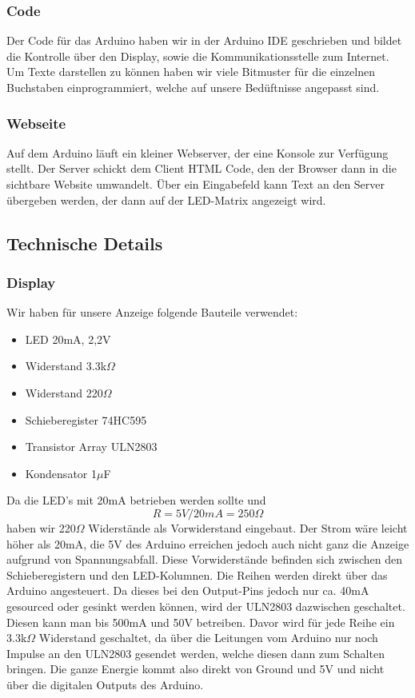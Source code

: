 \documentclass[10pt,a4paper]{article}
\begin{document}
\subsubsection{Code}

Der Code für das Arduino haben wir in der Arduino IDE geschrieben und bildet die Kontrolle über den Display, sowie die Kommunikationsstelle zum Internet.\\
Um Texte darstellen zu können haben wir viele Bitmuster für die einzelnen Buchstaben einprogrammiert, welche auf unsere Bedüftnisse angepasst sind.\\

\subsubsection{Webseite}

Auf dem Arduino läuft ein kleiner Webserver, der eine Konsole zur Verfügung stellt. Der Server schickt dem Client HTML Code, den der Browser dann in die sichtbare Website umwandelt. Über ein Eingabefeld kann Text an den Server übergeben werden, der dann auf der LED-Matrix angezeigt wird.

\subsection{Technische Details}

\subsubsection{Display}

Wir haben für unsere Anzeige folgende Bauteile verwendet:

\begin{itemize}
\item LED 20mA, 2,2V
\item Widerstand 3.3k$\Omega$
\item Widerstand 220$\Omega$
\item Schieberegister 74HC595
\item Transistor Array ULN2803
\item Kondensator 1$\mu$F
\end{itemize}

Da die LED's mit 20mA betrieben werden sollte und  \[R = 5V/20mA = 250\Omega\] haben wir 220$\Omega$ Widerstände als Vorwiderstand eingebaut. Der Strom wäre leicht höher als 20mA, die 5V des Arduino erreichen jedoch auch nicht ganz die Anzeige aufgrund von Spannungsabfall. Diese Vorwiderstände befinden sich zwischen den Schieberegistern und den LED-Kolumnen. Die Reihen werden direkt über das Arduino angesteuert. Da dieses bei den Output-Pins jedoch nur ca. 40mA gesourced oder gesinkt werden können, wird der ULN2803 dazwischen geschaltet. Diesen kann man bis 500mA und 50V betreiben. Davor wird für jede Reihe ein 3.3k$\Omega$ Widerstand geschaltet, da über die Leitungen vom Arduino nur noch Impulse an den ULN2803 gesendet werden, welche diesen dann zum Schalten bringen. Die ganze Energie kommt also direkt von Ground und 5V und nicht über die digitalen Outputs des Arduino.
\end{document}
